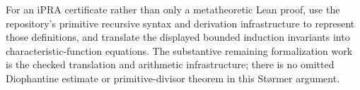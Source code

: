 For an iPRA certificate rather than only a metatheoretic Lean proof, use the
repository's primitive recursive syntax and derivation infrastructure to
represent those definitions, and translate the displayed bounded induction
invariants into characteristic-function equations.  The substantive remaining
formalization work is the checked translation and arithmetic infrastructure;
there is no omitted Diophantine estimate or primitive-divisor theorem in this
St\o rmer argument.
